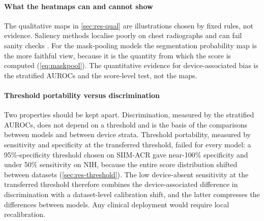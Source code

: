 \documentclass{ieeeaccess}
\begin{document}
\paragraph{What the heatmaps can and cannot show}
The qualitative maps in \cref{sec:res-qual} are illustrations chosen by fixed rules, not evidence. Saliency methods localise poorly on chest radiographs and can fail sanity checks \cite{saporta2022saliency,arun2021saliency}. For the mask-pooling models the segmentation probability map is the more faithful view, because it is the quantity from which the score is computed (\cref{eq:maskpool}). The quantitative evidence for device-associated bias is the stratified AUROCs and the score-level test, not the maps.

\paragraph{Threshold portability versus discrimination}
Two properties should be kept apart. Discrimination, measured by the stratified AUROCs, does not depend on a threshold and is the basis of the comparisons between models and between device strata. Threshold portability, measured by sensitivity and specificity at the transferred threshold, failed for every model: a 95\%-specificity threshold chosen on SIIM-ACR gave near-100\% specificity and under 50\% sensitivity on NIH, because the entire score distribution shifted between datasets (\cref{sec:res-threshold}). The low device-absent sensitivity at the transferred threshold therefore combines the device-associated difference in discrimination with a dataset-level calibration shift, and the latter compresses the differences between models. Any clinical deployment would require local recalibration.
\end{document}
